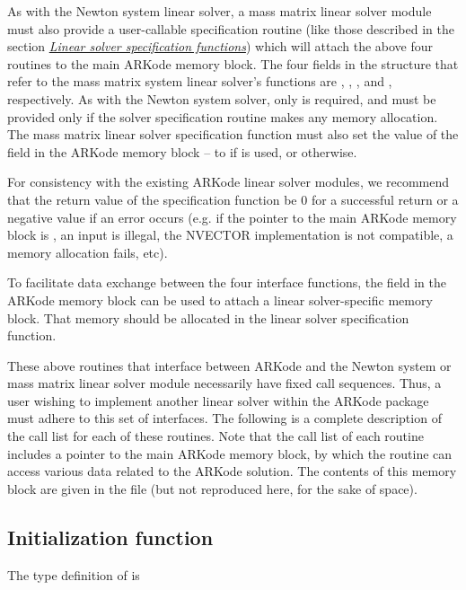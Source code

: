 \documentclass[letterpaper,10pt,english]{sphinxmanual}
\begin{document}
As with the Newton system linear solver, a mass matrix linear solver
module must also provide a user-callable specification routine (like
those described in the section {\hyperref[c_interface/User_callable:cinterface-linearsolvers]{\emph{Linear solver specification functions}}}) which
will attach the above four routines to the main ARKode memory
block.  The four fields in the  structure that refer to
the mass matrix system linear solver's functions are ,
, , and , respectively.  As
with the Newton system solver, only {\hyperref[linear_solvers/custom:msolve]{}} is required,
and {\hyperref[linear_solvers/custom:mfree]{}} must be provided only if the solver
specification routine makes any memory allocation.  The mass matrix
linear solver specification function must also set the value of the
field  in the ARKode memory block -- to
 if {\hyperref[linear_solvers/custom:msetup]{}} is used, or  otherwise.

For consistency with the existing ARKode linear solver modules, we
recommend that the return value of the specification function be 0 for
a successful return or a negative value if an error occurs (e.g. if
the pointer to the main ARKode memory block is , an input is
illegal, the NVECTOR implementation is not compatible, a memory
allocation fails, etc).

To facilitate data exchange between the four interface functions, the
field  in the ARKode memory block can be used to
attach a linear solver-specific memory block.  That memory should be
allocated in the linear solver specification function.

These above routines that interface between ARKode and the Newton
system or mass matrix linear solver module necessarily have fixed call
sequences.  Thus, a user wishing to implement another linear solver
within the ARKode package must adhere to this set of interfaces.  The
following is a complete description of the call list for each of these
routines.  Note that the call list of each routine includes a pointer
to the main ARKode memory block, by which the routine can access
various data related to the ARKode solution. The contents of this
memory block are given in the file  (but not
reproduced here, for the sake of space).


\subsection{Initialization function}
\label{linear_solvers/custom:initialization-function}
The type definition of {\hyperref[linear_solvers/custom:linit]{}} is
\end{document}
